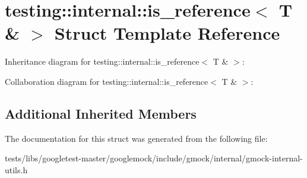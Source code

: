 \hypertarget{structtesting_1_1internal_1_1is__reference_3_01T_01_6_01_4}{}\section{testing\+:\+:internal\+:\+:is\+\_\+reference$<$ T \& $>$ Struct Template Reference}
\label{structtesting_1_1internal_1_1is__reference_3_01T_01_6_01_4}


Inheritance diagram for testing\+:\+:internal\+:\+:is\+\_\+reference$<$ T \& $>$\+:


Collaboration diagram for testing\+:\+:internal\+:\+:is\+\_\+reference$<$ T \& $>$\+:
\subsection*{Additional Inherited Members}


The documentation for this struct was generated from the following file\+:\begin{DoxyCompactItemize}
\item 
tests/libs/googletest-\/master/googlemock/include/gmock/internal/gmock-\/internal-\/utils.\+h\end{DoxyCompactItemize}
